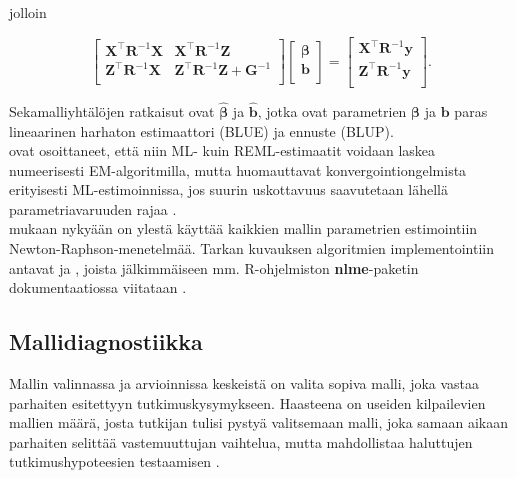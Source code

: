 \documentclass[finnish]{docopts}
\begin{document}
jolloin

$$
\begin{bmatrix}
\bm{X}^\top \bm{R}^{-1} \bm{X} & \bm{X}^\top \bm{R}^{-1} \bm{Z} \\
\bm{Z}^\top \bm{R}^{-1} \bm{X} & \bm{Z}^\top \bm{R}^{-1} \bm{Z} + \bm{G}^{-1}\\
\end{bmatrix}
\begin{bmatrix}
\bm{\beta} \\
\bm{b}\\
\end{bmatrix}
=
\begin{bmatrix}
\bm{X}^\top \bm{R}^{-1} \bm{y} \\
\bm{Z}^\top \bm{R}^{-1} \bm{y}\\
\end{bmatrix}.
$$

Sekamalliyhtälöjen ratkaisut ovat $\hat{\bm{\beta}}$ ja $\hat{\bm{b}}$, jotka ovat parametrien $\bm{\beta}$ ja $\bm{b}$ paras lineaarinen harhaton estimaattori (BLUE) ja ennuste (BLUP).\\

\cite{laird82} ovat osoittaneet, että niin ML- kuin REML-estimaatit voidaan laskea numeerisesti EM-algoritmilla, mutta huomauttavat konvergointiongelmista erityisesti ML-estimoinnissa, jos suurin uskottavuus saavutetaan lähellä parametriavaruuden rajaa \cite{verbeke00}.\\

\cite{verbeke00} mukaan nykyään on ylestä käyttää kaikkien mallin parametrien estimointiin Newton-Raphson-menetelmää. Tarkan kuvauksen algoritmien implementointiin antavat \cite{lindstrom88} ja \cite{lindstrom90}, joista jälkimmäiseen mm. R-ohjelmiston \cite{rsoftware} \textbf{nlme}-paketin dokumentaatiossa viitataan \cite{nlme13}.\\

\subsection{Mallidiagnostiikka}
\label{sub:mallidiag}

Mallin valinnassa ja arvioinnissa keskeistä on valita sopiva malli, joka vastaa parhaiten esitettyyn tutkimuskysymykseen. Haasteena on useiden kilpailevien mallien määrä, josta tutkijan tulisi pystyä valitsemaan malli, joka samaan aikaan parhaiten selittää vastemuuttujan vaihtelua, mutta mahdollistaa haluttujen tutkimushypoteesien testaamisen \cite{west14}.\\
\end{document}
